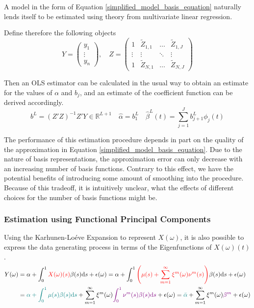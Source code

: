 \documentclass[11pt,twoside,a4paper]{article}
\begin{document}
	A model in the form of Equation \ref{simplified_model_basis_equation} naturally lends itself to be estimated using theory from multivariate linear regression. 
	
	Define therefore the following objects
	\begin{equation}\label{regressor_mat_1}
		Y = \begin{pmatrix}
			y_1 \\ \vdots \\ y_n
		\end{pmatrix}, \quad
		Z = \begin{pmatrix}
			1 & \tilde{Z}_{1,1} & \dots & \tilde{Z}_{1,J} \\
			\vdots & \vdots & \ddots & \vdots \\
			1 & \tilde{Z}_{N,1} & \dots & \tilde{Z}_{N,J}
		\end{pmatrix}
	\end{equation}
	
	Then an OLS estimator can be calculated in the usual way to obtain an estimate for the values of $\alpha$ and $b_j$, and an estimate of the coefficient function can be derived accordingly.
	\begin{equation}
		b^L = \left(Z'Z\right)^{-1}Z'Y \in \mathbb{R}^{L+1} \quad \hat{\alpha} = b_{1}^{L} \quad \hat{\beta}^L(t) = \sum_{j = 1}^{J} b_{j+1}^L \phi_j(t)
	\end{equation}

	The performance of this estimation procedure depends in part on the quality of the approximation in Equation \ref{simplified_model_basis_equation}. Due to the nature of basis representations, the approximation error can only decrease with an increasing number of basis functions. Contrary to this effect, we have the potential benefits of introducing some amount of smoothing into the procedure. Because of this tradeoff, it is intuitively unclear, what the effects of different choices for the number of basis functions might be. 
	
	\subsubsection{Estimation using Functional Principal Components}\label{fpc_exp_transf}
	
	Using the Karhunen-Lo\'{e}ve Expansion to represent $X(\omega)$, it is also possible to express the data generating process in terms of the Eigenfunctions of $X(\omega)(t)$.
	\begin{equation}
		\begin{split}
			Y(\omega) &= \alpha + \int_{0}^{1} {\color{red}X(\omega)(s)} \beta(s) \mathrm{d}s + \epsilon(\omega)
			= \alpha + \int_{0}^{1} {\color{red}\left(\mu(s) + \sum_{m = 1}^{\infty} \xi^m(\omega) \nu^m(s)\right)} \beta(s) \mathrm{d}s + \epsilon(\omega)\\
			&= {\color{teal}\alpha + \int_{0}^{1} \mu(s) \beta(s) \mathrm{d}s} + \sum_{m = 1}^{\infty} \xi^m(\omega) {\color{violet}\int_{0}^{1} \nu^m(s) \beta(s) \mathrm{d}s} + \epsilon(\omega)
			= {\color{teal}\bar{\alpha}} + \sum_{m = 1}^{\infty} \xi^m(\omega) {\color{violet}\beta^m} + \epsilon(\omega)
		\end{split}
	\end{equation}
\end{document}
